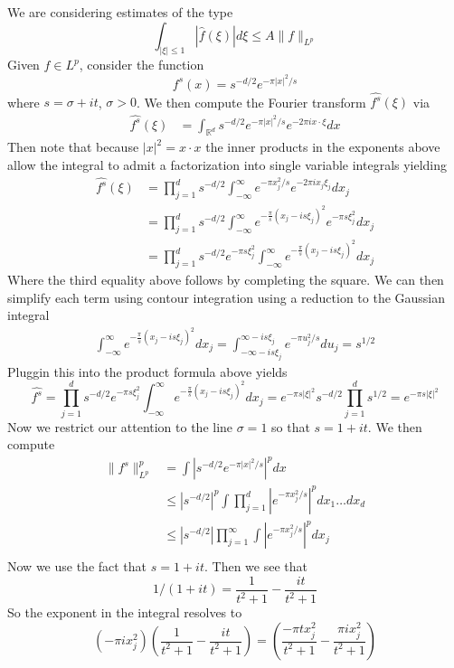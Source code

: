 \documentclass[11pt]{article}
\DeclareMathOperator{\R}{\mathbb{R}}
\newcommand{\lpnorm}[2]{\|#1\|_{L^{#2}}}
\begin{document}
We are considering estimates of the type
\[
\int_{|\xi| \leq 1} |\hat{f}(\xi)|d\xi \leq A\lpnorm{f}{p}
\]
Given $f \in L^p$, consider the function
\[
f^s(x) = s^{-d/2}e^{-\pi|x|^2/s}
\]
where $s = \sigma + it$, $\sigma > 0$. We then compute the Fourier
transform $\hat{f^s}(\xi)$ via
\begin{align*}
  \hat{f^s}(\xi) &= \int_{\R^d} s^{-d/2}e^{-\pi|x|^2/s}e^{-2\pi ix\cdot \xi}dx
\end{align*}
Then note that because $|x|^2 = x \cdot x$ the inner products in the
exponents above allow the integral to admit a factorization into
single variable integrals yielding
\begin{align*}
  \hat{f^s}(\xi) &= \prod_{j=1}^ds^{-d/2}\int_{-\infty}^\infty e^{-\pi
    x_j^2/s}e^{-2\pi ix_j\xi_j}dx_j \\
  &= \prod_{j=1}^ds^{-d/2}\int_{-\infty}^\infty
  e^{-\frac{\pi}{s}(x_j-is\xi_j)^2}e^{-\pi s\xi_j^2}dx_j \\
  &= \prod_{j=1}^ds^{-d/2}e^{-\pi s\xi_j^2}\int_{-\infty}^\infty
  e^{-\frac{\pi}{s}(x_j-is\xi_j)^2}dx_j
\end{align*}
Where the third equality above follows by completing the square. We
can then simplify each term using contour integration using a
reduction to the Gaussian integral
\begin{align*}
  \int_{-\infty}^\infty e^{-\frac{\pi}{s}(x_j-is\xi_j)^2}dx_j =
  \int_{-\infty-is\xi_j}^{\infty-is\xi_j} e^{-\pi u_j^2/s}du_j =
  s^{1/2}
\end{align*}
Pluggin this into the product formula above yields
\[
\hat{f^s} = \prod_{j=1}^ds^{-d/2}e^{-\pi
  s\xi_j^2}\int_{-\infty}^\infty e^{-\frac{\pi}{s}(x_j-is\xi_j)^2}dx_j
= e^{-\pi s|\xi|^2}s^{-d/2}\prod_{j=1}^d s^{1/2} = e^{-\pi s|\xi|^2}
\]
Now we restrict our attention to the line $\sigma = 1$ so that $s = 1
+ it$. We then compute
\begin{align*}
  \lpnorm{f^s}{p}^p &= \int \left|s^{-d/2}e^{-\pi|x|^2/s}\right|^pdx \\
  &\leq |s^{-d/2}|^p\int \prod_{j=1}^d
  \left| e^{-\pi x_j^2/s}\right|^pdx_1\ldots dx_d \\
  &\leq |s^{-d/2}|\prod_{j=1}^\infty \int \left|e^{-\pi x_j^2/s}\right|^pdx_j \\
\end{align*}
Now we use the fact that $s = 1 + it$. Then we see that
\[
1/(1+it) = \frac{1}{t^2+1} - \frac{it}{t^2+1}
\]
So the exponent in the integral resolves to
\[
(-\pi ix_j^2)\left(\frac{1}{t^2+1} - \frac{it}{t^2+1}\right) =
\left(\frac{-\pi tx_j^2}{t^2+1} - \frac{\pi i x_j^2}{t^2+1}\right)
\]
\end{document}
